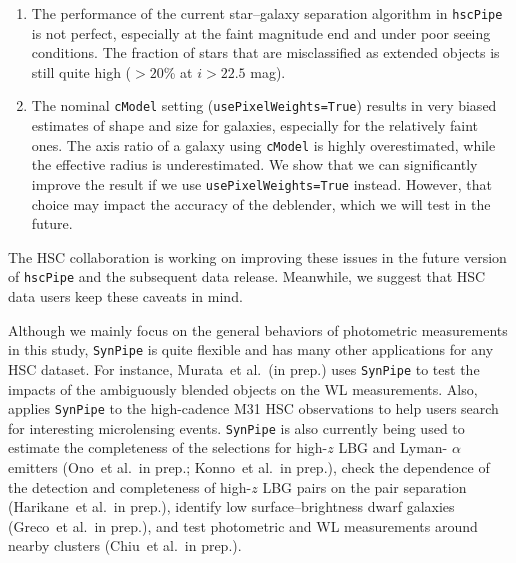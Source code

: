 \documentclass[useamsfonts]{pasj01}
\def\etal{{\ et al.~}}
\def\hscpipe{\texttt{hscPipe}}
\def\synpipe{\texttt{SynPipe}}
\def\cmodel{\texttt{cModel}}
\begin{document}
    \begin{enumerate}

        \item The performance of the current star--galaxy separation algorithm in \hscpipe{}
            is not perfect, especially at the faint magnitude end and under poor seeing
            conditions.
            The fraction of stars that are misclassified as extended objects is still
            quite high ($>20$\% at $i> 22.5$ mag).

        \item The nominal \cmodel{} setting  (\texttt{usePixelWeights=True}) results
            in very biased estimates of shape and size for galaxies, especially for the
            relatively faint ones.
            The axis ratio of a galaxy using \cmodel{} is highly overestimated, while
            the effective radius is underestimated.
            We show that we can significantly improve the result if we use \texttt{usePixelWeights=True} instead.
            However, that choice may impact the accuracy of the deblender, which we will test in the future.

    \end{enumerate}

    The HSC collaboration is working on improving these issues in the future version
    of \hscpipe{} and the subsequent data release.
    Meanwhile, we suggest that HSC data users keep these caveats in mind.

    Although we mainly focus on the general behaviors of photometric measurements in this study,
    \synpipe{} is quite flexible and has many other applications for any HSC
    dataset.
    For instance,  Murata\etal (in prep.) uses \synpipe{} to test
    the impacts of the ambiguously blended objects on the WL measurements.
    Also, \citep{Niikura2017} applies \synpipe{} to the high-cadence M31 HSC observations
    to help users search for interesting microlensing events.
  \synpipe{} is also currently being used to estimate the completeness of the selections
    for high-$z$ LBG and Lyman- $\alpha$ emitters
    (Ono\etal in prep.; Konno\etal in prep.), check the dependence of the detection and
    completeness of high-$z$ LBG pairs on the pair separation (Harikane\etal in prep.),
    identify low surface--brightness dwarf galaxies (Greco\etal in prep.),
    and test photometric and WL measurements around nearby clusters (Chiu\etal in prep.).
\end{document}
